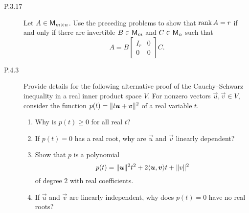 \documentclass{homework}
\date{Tuesday 2/5}
\author{}
\begin{document}
\begin{description}
\item[P.3.17] Let \(A \in \mathsf{M}_{m\times n}\).  Use the preceding
  problems to show that \(\operatorname{rank} A = r\) if and only if there are
  invertible \(B \in \mathsf{M}_m\) and \(C \in \mathsf{M}_n\) such that
  \[
    A = B
    \begin{bmatrix}
      I_r & 0 \\
      0   & 0
    \end{bmatrix}
    C.
  \]

  \begin{solution}

  \end{solution}

\item[P.4.3] Provide details for the following alternative proof of
  the Cauchy--Schwarz inequality in a real inner product space \(V\).
  For nonzero vectors \(\vec u, \vec v \in V\), consider the function
  \(p(t) = \norm{t \vec u + \vec v}^2\) of a real variable \(t\).
  \begin{enumerate}
  \item Why is \(p(t) \ge 0\) for all real \(t\)?

    \begin{solution}

    \end{solution}

  \item If \(p(t) = 0\) has a real root, why are \(\vec u\) and
    \(\vec v\) linearly dependent?  \label{part:root-dependent}

    \begin{solution}

    \end{solution}

  \item Show that \(p\) is a polynomial
    \[
      p(t) =
      \norm{\vec u}^2 t^2        +
      2 \inner{\vec u, \vec v} t +
      \norm{v}^2
    \]
    of degree \(2\) with real coefficients.

    \begin{solution}

    \end{solution}

  \item If \(\vec u\) and \(\vec v\) are linearly independent, why
    does \(p(t) = 0\) have no real roots?

    \begin{solution}


\end{solution}
\end{enumerate}
\end{description}
\end{document}
